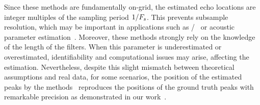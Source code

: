 Since these methods are fundamentally on-grid, the estimated echo locations are integer multiples of the sampling period $1/F_s$.
This prevents subsample resolution, which may be important in applications such as \RooGE/~ or acoustic parameter estimation~.
Moreover, these methods strongly rely on the knowledge of the length of the filters.
When this parameter is underestimated or overestimated, identifiability and computational issues may arise, affecting the estimation.
Nevertheless, despite this slight mismatch between theoretical assumptions and real data, for some scenarios, the position of the estimated peaks by the methods~ reproduces the positions of the ground truth peaks with remarkable precision as demonstrated in our work~\cite{di2020blaster}.

